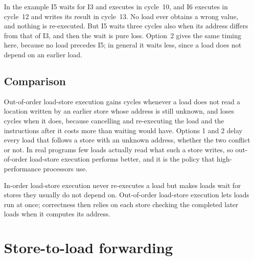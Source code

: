 \documentclass[../main.tex]{subfiles}
\begin{document}
In the example I5 waits for I3 and executes in cycle~10, and I6 executes in
cycle~12 and writes its result in cycle~13.  No load ever obtains a wrong
value, and nothing is re-executed.  But I5 waits three cycles also when its
address differs from that of I3, and then the wait is pure loss.  Option~2
gives the same timing here, because no load precedes I5; in general it waits
less, since a load does not depend on an earlier load.

\subsection{Comparison}

Out-of-order load-store execution gains cycles whenever a load does not read a
location written by an earlier store whose address is still unknown, and loses
cycles when it does, because cancelling and re-executing the load and the
instructions after it costs more than waiting would have.  Options 1 and 2
delay every load that follows a store with an unknown address, whether the two
conflict or not.  In real programs few loads actually read what such a store
writes, so out-of-order load-store execution performs better, and it is the
policy that high-performance processors use.

\begin{keypoint}
  In-order load-store execution never re-executes a load but makes loads wait
  for stores they usually do not depend on.  Out-of-order load-store execution
  lets loads run at once; correctness then relies on each store checking the
  completed later loads when it computes its address.
\end{keypoint}

\section{Store-to-load forwarding}
\label{sec:l09-forwarding}
\end{document}
